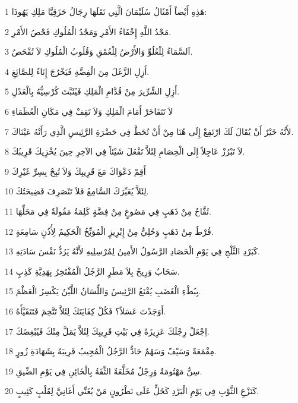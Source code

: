 \par 1 هَذِهِ أَيْضاً أَمْثَالُ سُلَيْمَانَ الَّتِي نَقَلَهَا رِجَالُ حَزَقِيَّا مَلِكِ يَهُوذَا:
\par 2 مَجْدُ اللَّهِ إِخْفَاءُ الأَمْرِ وَمَجْدُ الْمُلُوكِ فَحْصُ الأَمْرِ.
\par 3 اَلسَّمَاءُ لِلْعُلُوِّ وَالأَرْضُ لِلْعُمْقِ وَقُلُوبُ الْمُلُوكِ لاَ تُفْحَصُ.
\par 4 أَزِلِ الزَّغَلَ مِنَ الْفِضَّةِ فَيَخْرُجَ إِنَاءٌ لِلصَّائِغِ.
\par 5 أَزِلِ الشِّرِّيرَ مِنْ قُدَّامِ الْمَلِكِ فَيُثَبَّتَ كُرْسِيُّهُ بِالْعَدْلِ.
\par 6 لاَ تَتَفَاخَرْ أَمَامَ الْمَلِكِ وَلاَ تَقِفْ فِي مَكَانِ الْعُظَمَاءِ
\par 7 لأَنَّهُ خَيْرٌ أَنْ يُقَالَ لَكَ ارْتَفِعْ إِلَى هُنَا مِنْ أَنْ تُحَطَّ فِي حَضْرَةِ الرَّئِيسِ الَّذِي رَأَتْهُ عَيْنَاكَ.
\par 8 لاَ تَبْرُزْ عَاجِلاً إِلَى الْخِصَامِ لِئَلاَّ تَفْعَلَ شَيْئاً فِي الآخِرِ حِينَ يُخْزِيكَ قَرِيبُكَ.
\par 9 أَقِمْ دَعْوَاكَ مَعَ قَرِيبِكَ وَلاَ تُبِحْ بِسِرِّ غَيْرِكَ
\par 10 لِئَلاَّ يُعَيِّرَكَ السَّامِعُ فَلاَ تَنْصَرِفَ فَضِيحَتُكَ.
\par 11 تُفَّاحٌ مِنْ ذَهَبٍ فِي مَصُوغٍ مِنْ فِضَّةٍ كَلِمَةٌ مَقُولَةٌ فِي مَحَلِّهَا.
\par 12 قُرْطٌ مِنْ ذَهَبٍ وَحُلِيٌّ مِنْ إِبْرِيزٍ الْمُوَبِّخُ الْحَكِيمُ لِأُذُنٍ سَامِعَةٍ.
\par 13 كَبَرْدِ الثَّلْجِ فِي يَوْمِ الْحَصَادِ الرَّسُولُ الأَمِينُ لِمُرْسِلِيهِ لأَنَّهُ يَرُدُّ نَفْسَ سَادَتِهِ.
\par 14 سَحَابٌ وَرِيحٌ بِلاَ مَطَرٍ الرَّجُلُ الْمُفْتَخِرُ بِهَدِيَّةِ كَذِبٍ.
\par 15 بِبُطْءِ الْغَضَبِ يُقْنَعُ الرَّئِيسُ وَاللِّسَانُ اللَّيِّنُ يَكْسِرُ الْعَظْمَ.
\par 16 أَوَجَدْتَ عَسَلاً؟ فَكُلْ كِفَايَتَكَ لِئَلاَّ تَتَّخِمَ فَتَتَقَيَّأَهُ.
\par 17 اِجْعَلْ رِجْلَكَ عَزِيزَةً فِي بَيْتِ قَرِيبِكَ لِئَلاَّ يَمَلَّ مِنْكَ فَيُبْغِضَكَ.
\par 18 مِقْمَعَةٌ وَسَيْفٌ وَسَهْمٌ حَادٌّ الرَّجُلُ الْمُجِيبُ قَرِيبَهُ بِشَهَادَةِ زُورٍ.
\par 19 سِنٌّ مَهْتُومَةٌ وَرِجْلٌ مُخَلَّعَةٌ الثِّقَةُ بِالْخَائِنِ فِي يَوْمِ الضِّيقِ.
\par 20 كَنَزْعِ الثَّوْبِ فِي يَوْمِ الْبَرْدِ كَخَلٍّ عَلَى نَطْرُونٍ مَنْ يُغَنِّي أَغَانِيَّ لِقَلْبٍ كَئِيبٍ.
